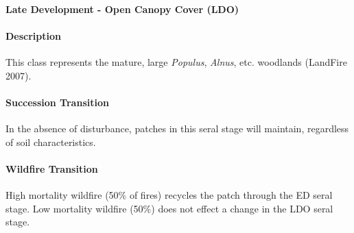 \hrulefill


\paragraph{Late Development - Open Canopy Cover (LDO)}

\paragraph{Description} This class represents the mature, large \emph{Populus}, \emph{Alnus}, etc. woodlands (LandFire 2007).

\paragraph{Succession Transition} In the absence of disturbance, patches in this seral stage will maintain, regardless of soil characteristics.

\paragraph{Wildfire Transition} High mortality wildfire (50\% of fires) recycles the patch through the ED seral stage. Low mortality wildfire (50\%) does not effect a change in the LDO seral stage.

\hrulefill





